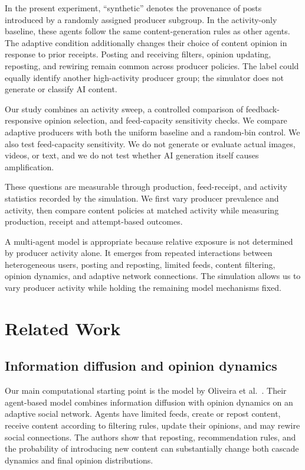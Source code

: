 \documentclass[runningheads]{llncs}
\begin{document}
In the present experiment, ``synthetic'' denotes the provenance of posts introduced by a randomly assigned producer subgroup. In the activity-only baseline, these agents follow the same content-generation rules as other agents. The adaptive condition additionally changes their choice of content opinion in response to prior receipts. Posting and receiving filters, opinion updating, reposting, and rewiring remain common across producer policies. The label could equally identify another high-activity producer group; the simulator does not generate or classify AI content.

Our study combines an activity sweep, a controlled comparison of feedback-responsive opinion selection, and feed-capacity sensitivity checks. We compare adaptive producers with both the uniform baseline and a random-bin control. We also test feed-capacity sensitivity. We do not generate or evaluate actual images, videos, or text, and we do not test whether AI generation itself causes amplification.

These questions are measurable through production, feed-receipt, and activity statistics recorded by the simulation. We first vary producer prevalence and activity, then compare content policies at matched activity while measuring production, receipt and attempt-based outcomes.

A multi-agent model is appropriate because relative exposure is not determined by producer activity alone. It emerges from repeated interactions between heterogeneous users, posting and reposting, limited feeds, content filtering, opinion dynamics, and adaptive network connections. The simulation allows us to vary producer activity while holding the remaining model mechanisms fixed.

\section{Related Work}

\subsection{Information diffusion and opinion dynamics}
Our main computational starting point is the model by Oliveira et al.~\cite{oliveira2026}. Their agent-based model combines information diffusion with opinion dynamics on an adaptive social network. Agents have limited feeds, create or repost content, receive content according to filtering rules, update their opinions, and may rewire social connections. The authors show that reposting, recommendation rules, and the probability of introducing new content can substantially change both cascade dynamics and final opinion distributions.
\end{document}

